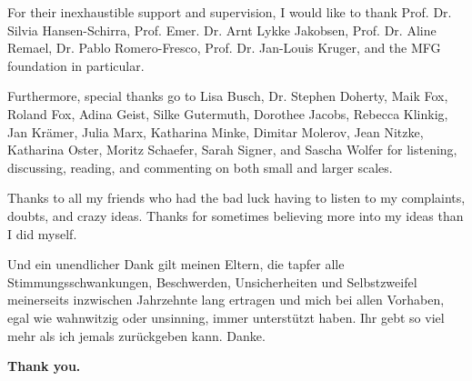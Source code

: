 For their inexhaustible support and supervision, I would like to thank Prof. Dr. Silvia Hansen-Schirra, Prof. Emer. Dr. Arnt Lykke Jakobsen, Prof. Dr. Aline Remael, Dr. Pablo Romero-Fresco, Prof. Dr. Jan-Louis Kruger, and the MFG foundation in particular.

Furthermore, special thanks go to Lisa Busch, Dr. Stephen Doherty, Maik Fox, Roland Fox, Adina Geist, Silke Gutermuth, Dorothee Jacobs, Rebecca Klinkig, Jan Krämer, Julia Marx, Katharina Minke, Dimitar Molerov, Jean Nitzke, Katharina Oster, Moritz Schaefer, Sarah Signer, and Sascha Wolfer for listening, discussing, reading, and commenting on both small and larger scales.

Thanks to all my friends who had the bad luck having to listen to my complaints, doubts, and crazy ideas. Thanks for sometimes believing more into my ideas than I did myself.

Und ein unendlicher Dank gilt meinen Eltern, die tapfer alle Stimmungsschwankungen, Beschwerden, Unsicherheiten und Selbstzweifel meinerseits inzwischen Jahrzehnte lang ertragen und mich bei allen Vorhaben, egal wie wahnwitzig oder unsinning, immer unterstützt haben. Ihr gebt so viel mehr als ich jemals zurückgeben kann. Danke.

{
\bfseries
Thank you.}